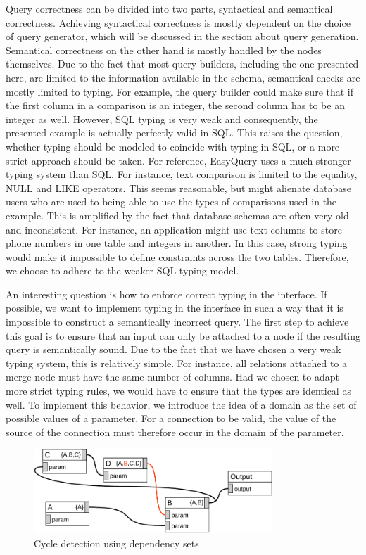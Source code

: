 \documentclass[11pt,a4paper]{globis-book}
\begin{document}
Query correctness can be divided into two parts, syntactical and semantical correctness. Achieving syntactical correctness is mostly dependent on the choice of query generator, which will be discussed in the section about query generation. Semantical correctness on the other hand is mostly handled by the nodes themselves. Due to the fact that most query builders, including the one presented here, are limited to the information available in the schema, semantical checks are mostly limited to typing. For example, the query builder could make sure that if the first column in a comparison is an integer, the second column has to be an integer as well. However, SQL typing is very weak and consequently, the presented example is actually perfectly valid in SQL. This raises the question, whether typing should be modeled to coincide with typing in SQL, or a more strict approach should be taken. For reference, EasyQuery uses a much stronger typing system than SQL. For instance, text comparison is limited to the equality, NULL and LIKE operators. This seems reasonable, but might alienate database users who are used to being able to use the types of comparisons used in the example. This is amplified by the fact that database schemas are often very old and inconsistent. For instance, an application might use text columns to store phone numbers in one table and integers in another. In this case, strong typing would make it impossible to define constraints across the two tables. Therefore, we choose to adhere to the weaker SQL typing model.

An interesting question is how to enforce correct typing in the interface. If possible, we want to implement typing in the interface in such a way that it is impossible to construct a semantically incorrect query. The first step to achieve this goal is to ensure that an input can only be attached to a node if the resulting query is semantically sound. Due to the fact that we have chosen a very weak typing system, this is relatively simple. For instance, all relations attached to a merge node must have the same number of columns. Had we chosen to adapt more strict typing rules, we would have to ensure that the types are identical as well. To implement this behavior, we introduce the idea of a domain as the set of possible values of a parameter. For a connection to be valid, the value of the source of the connection must therefore occur in the domain of the parameter.

\begin{figure}[h]
  \centering
  \includegraphics[width=0.8\textwidth]{resources/Cycle.pdf}
  \caption{Cycle detection using dependency sets}
  \label{fig:cycle}
\end{figure}
\end{document}
